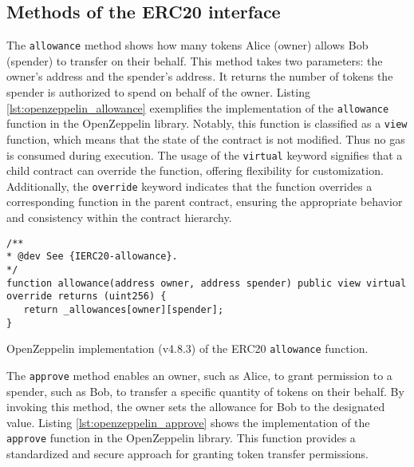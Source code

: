 
\subsection{Methods of the ERC20 interface}
\label{subsec:erc20_methods}


The \texttt{allowance} method shows how many tokens Alice (owner) allows Bob (spender) to transfer on their behalf. This method takes two parameters: the owner's address and the spender's address. It returns the number of tokens the spender is authorized to spend on behalf of the owner.
Listing \ref{lst:openzeppelin_allowance} exemplifies the implementation of the \texttt{allowance} function in the OpenZeppelin library.
Notably, this function is classified as a \texttt{view} function, which means that the state of the contract is not modified. Thus no gas is consumed during execution.
The usage of the \texttt{virtual} keyword signifies that a child contract can override the function, offering flexibility for customization. Additionally, the \texttt{override} keyword indicates that the
function overrides a corresponding function in the parent contract, ensuring the appropriate behavior and consistency within the contract hierarchy.

\begin{listing}[!ht]
   \begin{verbatim}
/**
* @dev See {IERC20-allowance}.
*/
function allowance(address owner, address spender) public view virtual override returns (uint256) {
   return _allowances[owner][spender];
}
   \end{verbatim}
   \caption{OpenZeppelin implementation (v4.8.3) of the ERC20 \texttt{allowance} function.}
   \label{lst:openzeppelin_allowance}
\end{listing}



The \texttt{approve} method enables an owner, such as Alice, to grant permission to a spender, such as Bob, to transfer a specific quantity of tokens on their behalf. By invoking this method, the owner sets the allowance for Bob to the designated value.
Listing \ref{lst:openzeppelin_approve} shows the implementation of the \texttt{approve} function in the OpenZeppelin library. 
This function provides a standardized and secure approach for granting token transfer permissions.

